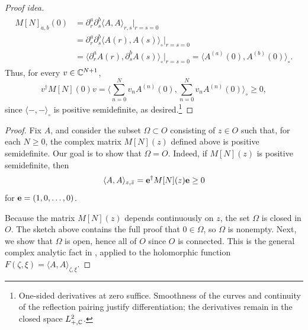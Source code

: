 \begin{proof}[Proof idea]
\begin{align}
\begin{split}
 M[N]_{a,b}(0)
 &=\partial_r^a\partial_s^b\langle A,A\rangle_{r,s}
       \Big|_{r=s=0}\\
 &=\partial_r^a\partial_s^b\langle A(r),A(s)\rangle_\circ
       \Big|_{r=s=0}\\
 &=\langle\partial_r^a A(r),\partial_s^b A(s)\rangle_\circ
       \Big|_{r=s=0}
 =\langle A^{(a)}(0),A^{(b)}(0)\rangle_\circ.
\end{split}
\end{align}
Thus, for every $v\in\mathbb{C}^{N+1}$,
\begin{equation}
 v^\dagger M[N](0)v
 =\Big\langle\sum_{n=0}^Nv_nA^{(n)}(0),
              \sum_{n=0}^Nv_nA^{(n)}(0)\Big\rangle_\circ\geq0,
\end{equation}
since $\langle-,-\rangle_\circ$ is positive semidefinite, as
desired.\footnote{One-sided derivatives at zero suffice. Smoothness
of the curves and continuity of the reflection pairing justify
differentiation; the derivatives remain in the closed space $L^2_{+,\mathbb{C}}$.}
\end{proof}

\begin{proof}
Fix $A$, and consider the subset $\Omega\subset O$ consisting of
$z\in O$ such that, for each $N\geq0$, the complex matrix $M[N](z)$
defined above is positive semidefinite.
Our goal is to show that $\Omega=O$. Indeed, if $M[N](z)$ is
positive semidefinite, then
\begin{equation}
 \langle A,A\rangle_{z,\bar z}
 =\mathbf{e}^\dagger M[N](z)\mathbf{e}\geq0
\end{equation}
for $\mathbf{e}=(1,0,\dots,0)$.

Because the matrix $M[N](z)$ depends continuously on $z$, the set
$\Omega$ is closed in $O$.
The sketch above contains the full proof that $0\in\Omega$, so
$\Omega$ is nonempty.
Next, we show that $\Omega$ is open, hence all of $O$ since $O$ is
connected. This is the general complex analytic fact in
, applied to the holomorphic function
$F(\zeta,\xi)=\langle A,A\rangle_{\zeta,\xi}$.
\end{proof}

